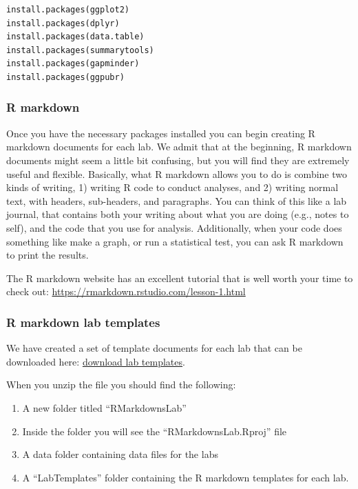 \documentclass[
]{book}
\providecommand{\tightlist}{%
  \setlength{\itemsep}{0pt}\setlength{\parskip}{0pt}}
\begin{document}
\begin{verbatim}
install.packages(ggplot2)
install.packages(dplyr)
install.packages(data.table)
install.packages(summarytools)
install.packages(gapminder)
install.packages(ggpubr)
\end{verbatim}

\hypertarget{r-markdown}{%
\subsubsection{R markdown}\label{r-markdown}}

Once you have the necessary packages installed you can begin creating R markdown documents for each lab. We admit that at the beginning, R markdown documents might seem a little bit confusing, but you will find they are extremely useful and flexible. Basically, what R markdown allows you to do is combine two kinds of writing, 1) writing R code to conduct analyses, and 2) writing normal text, with headers, sub-headers, and paragraphs. You can think of this like a lab journal, that contains both your writing about what you are doing (e.g., notes to self), and the code that you use for analysis. Additionally, when your code does something like make a graph, or run a statistical test, you can ask R markdown to print the results.

The R markdown website has an excellent tutorial that is well worth your time to check out: \url{https://rmarkdown.rstudio.com/lesson-1.html}

\hypertarget{r-markdown-lab-templates}{%
\subsubsection{R markdown lab templates}\label{r-markdown-lab-templates}}

We have created a set of template documents for each lab that can be downloaded here: \href{https://github.com/CrumpLab/statisticsLab/raw/master/RMarkdownsLab.zip}{download lab templates}.

When you unzip the file you should find the following:

\begin{enumerate}
\def\labelenumi{\arabic{enumi}.}
\tightlist
\item
  A new folder titled ``RMarkdownsLab''
\item
  Inside the folder you will see the ``RMarkdownsLab.Rproj'' file
\item
  A data folder containing data files for the labs
\item
  A ``LabTemplates'' folder containing the R markdown templates for each lab.
\end{enumerate}
\end{document}
